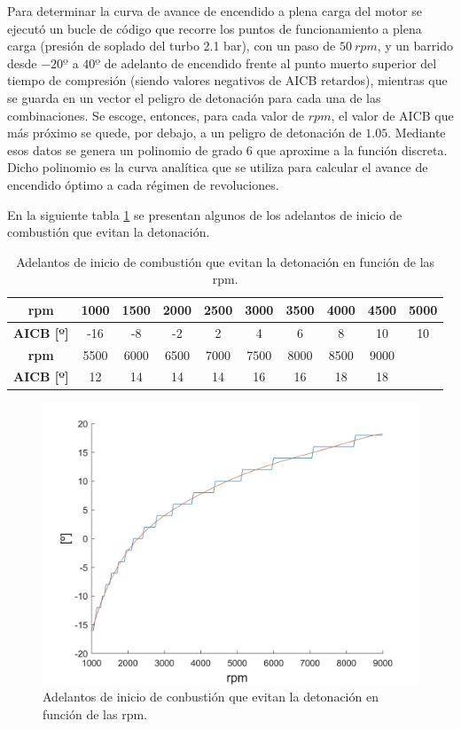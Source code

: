 Para determinar la curva de avance de encendido a plena carga del motor se ejecutó un bucle de código que recorre los puntos de funcionamiento a plena carga (presión de soplado del turbo 2.1 bar), con un paso de $50 \ rpm$, y un barrido desde $-20º$ a $40º$ de adelanto de encendido frente al punto muerto superior del tiempo de compresión (siendo valores negativos de AICB retardos), mientras que se guarda en un vector el peligro de detonación para cada una de las combinaciones. Se escoge, entonces, para cada valor de $rpm$, el valor de AICB que más próximo se quede, por debajo, a un peligro de detonación de $1.05$. Mediante esos datos se genera un polinomio de grado 6 que aproxime a la función discreta. Dicho polinomio es la curva analítica que se utiliza para calcular el avance de encendido óptimo a cada régimen de revoluciones.

En la siguiente tabla \ref{tab:rpm_AICB} se presentan algunos de los adelantos de inicio de combustión que evitan la detonación.
\begin{table}[htbp]
    \centering
    \begin{tabular}{|c|c|c|c|c|c|c|c|c|c|}
        \hline
        \textbf{rpm}       & 1000 & 1500 & 2000 & 2500 & 3000 & 3500 & 4000 & 4500 & 5000 \\ 
        \hline
        \textbf{AICB [º]} & -16  & -8   & -2   & 2    & 4    & 6    & 8    & 10   & 10   \\ 
        \hline
        \textbf{rpm}       & 5500 & 6000 & 6500 & 7000 & 7500 & 8000 & 8500 & 9000 & \\ 
        \hline
        \textbf{AICB [º]} & 12   & 14   & 14   & 14   & 16   & 16   & 18   & 18    & \\ 
        \hline
    \end{tabular}
    \caption{Adelantos de inicio de combustión que evitan la detonación en función de las rpm.}
    \label{tab:rpm_AICB}
\end{table}

\begin{figure}[H]
    \centering
    \includegraphics[width=0.6\linewidth]{Figures/01/regresion_aicb.jpg}
    \caption{Adelantos de inicio de conbustión que evitan la detonación en función de las rpm.}
    \label{fig:RPM_aicb}
\end{figure}

